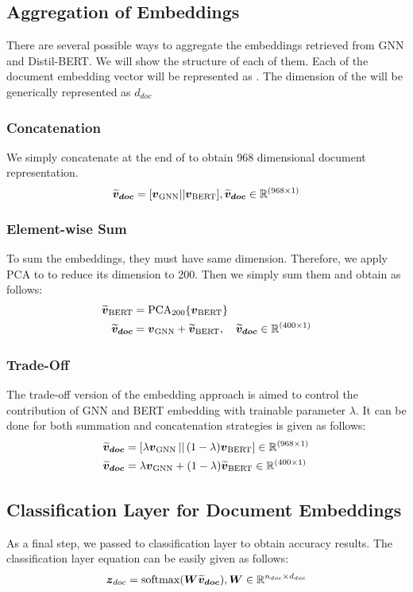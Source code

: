 \subsection{Aggregation of Embeddings}\label{aggregation}
There are several possible ways to aggregate the embeddings retrieved from GNN and Distil-BERT\@. We will show the structure of each of them. Each of the document embedding vector will be represented as \DOCEM{}. The dimension of the \DOCEM{} will be generically represented as \(d_{doc}\)
\subsubsection{Concatenation}\label{agg:concat}
We simply concatenate \BERTEM{} at the end of \GNNEM{} to obtain 968 dimensional document representation.
\begin{equation}
    \boldsymbol{\widetilde{v}_{doc}} = [\boldsymbol{v}_{\text{GNN}} || \boldsymbol{v}_{\text{BERT}}], \boldsymbol{\widetilde{v}_{doc}} \in \mathbb{R}^{(968\times 1)}
\end{equation}
\subsubsection{Element-wise Sum}\label{agg:sum}
To sum the embeddings, they must have same dimension. Therefore, we apply PCA to \BERTEM{} to reduce its dimension to 200. Then we simply sum them and obtain \DOCEM{} as follows:
\begin{align}
    \boldsymbol{\widetilde{v}}_{\text{BERT}} & = \operatorname{PCA}_{200}\{\boldsymbol{v}_{\text{BERT}}{}\}                         \\
    \boldsymbol{\widetilde{v}_{doc}}   & = \boldsymbol{v}_{\text{GNN}} + \boldsymbol{\widetilde{v}}_{\text{BERT}},\quad \boldsymbol{\widetilde{v}_{doc}} \in \mathbb{R}^{(400\times 1)}
\end{align}

\subsubsection{Trade-Off}\label{agg:trade-off}
The trade-off version of the embedding approach is aimed to control the contribution of GNN and BERT embedding with trainable parameter \(\lambda \). It can be done for both summation and concatenation strategies \DOCEM{} is given as follows:
\begin{align}
    \boldsymbol{\widetilde{v}_{doc}} & = [\lambda\boldsymbol{v}_{\text{GNN}}{}\, ||\, (1-\lambda)\boldsymbol{v}_{\text{BERT}}{}] \in \mathbb{R}^{(968\times 1)} \\
    \boldsymbol{\widetilde{v}_{doc}} & = \lambda\boldsymbol{v}_{\text{GNN}}{} + (1-\lambda)\boldsymbol{\widetilde{v}}_{\text{BERT}}{} \in \mathbb{R}^{(400\times 1)}
\end{align}

\subsection{Classification Layer for Document Embeddings}
As a final step, we passed \DOCEM{} to  classification layer to obtain accuracy results. The classification layer equation can be easily given as follows:
\begin{equation}
    \boldsymbol{z}_{doc} = \operatorname{softmax}(\boldsymbol{W}\boldsymbol{\widetilde{v}_{doc}}), \boldsymbol{W} \in \mathbb{R}^{n_{doc} \times d_{doc} }
\end{equation}